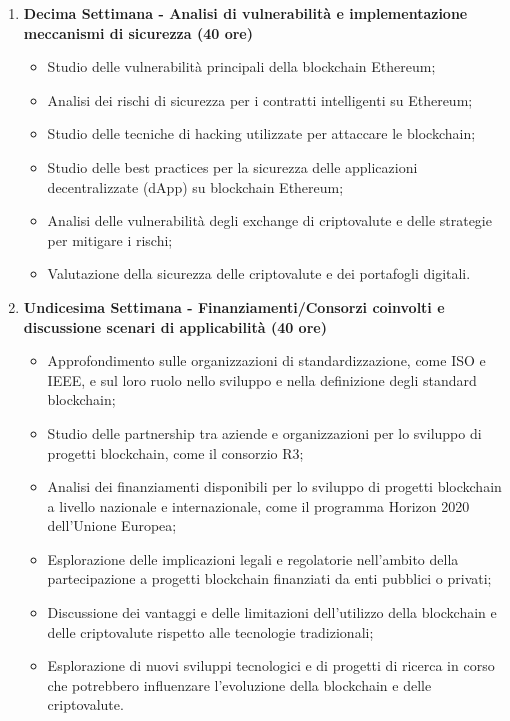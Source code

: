 {\begin{enumerate}
        \item \textbf{Decima Settimana - Analisi di vulnerabilità e implementazione meccanismi di sicurezza (40 ore)}
        \begin{itemize}
            \item Studio delle vulnerabilità principali della blockchain Ethereum;
            \item Analisi dei rischi di sicurezza per i contratti intelligenti su Ethereum;
            \item Studio delle tecniche di hacking utilizzate per attaccare le blockchain;
            \item Studio delle best practices per la sicurezza delle applicazioni decentralizzate (dApp) su blockchain Ethereum;
            \item Analisi delle vulnerabilità degli exchange di criptovalute e delle strategie per mitigare i rischi;
            \item Valutazione della sicurezza delle criptovalute e dei portafogli digitali.
        \end{itemize}

        \item \textbf{Undicesima Settimana - Finanziamenti/Consorzi coinvolti e discussione scenari di applicabilità (40 ore)}
        \begin{itemize}
            \item Approfondimento sulle organizzazioni di standardizzazione, come ISO e IEEE, e sul loro ruolo nello sviluppo e nella definizione degli standard blockchain;
            \item Studio delle partnership tra aziende e organizzazioni per lo sviluppo di progetti blockchain, come il consorzio R3;
            \item Analisi dei finanziamenti disponibili per lo sviluppo di progetti blockchain a livello nazionale e internazionale, come il programma Horizon 2020 dell'Unione Europea;
            \item Esplorazione delle implicazioni legali e regolatorie nell'ambito della partecipazione a progetti blockchain finanziati da enti pubblici o privati;
            \item Discussione dei vantaggi e delle limitazioni dell'utilizzo della blockchain e delle criptovalute rispetto alle tecnologie tradizionali;
            \item Esplorazione di nuovi sviluppi tecnologici e di progetti di ricerca in corso che potrebbero influenzare l'evoluzione della blockchain e delle criptovalute.
        \end{itemize} 

    \end{enumerate}
}

